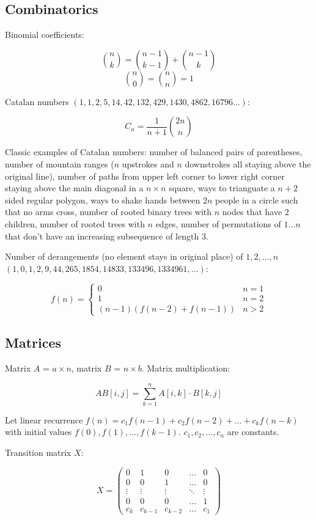 \documentclass{article}
\begin{document}
\subsection {Combinatorics}

Binomial coefficients:

\[ \binom{n}{k} = \binom{n-1}{k-1} + \binom{n-1}{k} \]
\[ \binom{n}{0} = \binom{n}{n} = 1 \]

Catalan numbers $(1, 1, 2, 5, 14, 42, 132, 429, 1430, 4862, 16796 \dots)$:

\[ C_n = \frac{1}{n+1} \binom{2n}{n} \]

Classic examples of Catalan numbers: number of balanced pairs of parentheses,  number of mountain ranges ($n$ upstrokes and $n$ downstrokes all staying above the original line), number of paths from upper left corner to lower right corner staying above the main diagonal in a $n \times n$ square, ways to trianguate a $n+2$ sided regular polygon, ways to shake hands between $2n$ people in a circle such that no arms cross, number of rooted binary trees with $n$ nodes that have $2$ children, number of rooted trees with $n$ edges, number of permutations of $1 \dots n$ that don't have an increasing subsequence of length $3$.

Number of derangements (no element stays in original place) of $1, 2, \dots, n$ $(1, 0, 1, 2, 9, 44, 265, 1854, 14833, 133496, 1334961, \dots)$:

\[
	f(n) =
	\begin{cases}
		0 &n = 1 \\
		1 &n = 2 \\
		(n-1)(f(n-2)+f(n-1)) &n > 2
	\end{cases}
\]

\subsection {Matrices}

Matrix $A$ = $a \times n$, matrix $B$ = $n \times b$. Matrix multiplication:

\[ AB[i,j] = \sum_{k=1}^{n} A[i,k] \cdot B[k,j] \]

Let linear recurrence $f(n) = c_1f(n-1) + c_2f(n-2) + \dots + c_kf(n-k)$ with initial values $f(0), f(1), \dots, f(k-1)$. $c_1, c_2, \dots, c_n$ are constants.

Transition matrix $X$:

\[
	X =
	\begin{pmatrix}
		0 & 1 & 0 & \dots & 0 \\
		0 & 0 & 1 & \dots & 0 \\
		\vdots & \vdots & \vdots & \ddots & \vdots \\
		0 & 0 & 0 & \dots & 1 \\
		c_k & c_{k-1} & c_{k-2} & \dots & c_1
	\end{pmatrix}
\]
\end{document}
